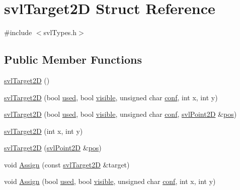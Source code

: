 \hypertarget{structsvl_target2_d}{\section{svl\-Target2\-D Struct Reference}
\label{structsvl_target2_d}
}


{\ttfamily \#include $<$svl\-Types.\-h$>$}

\subsection*{Public Member Functions}
\begin{DoxyCompactItemize}
\item 
\hyperlink{structsvl_target2_d_ae8f0d611fa66af1f6a157fec39503855}{svl\-Target2\-D} ()
\item 
\hyperlink{structsvl_target2_d_adcf9742ca9daddef7bb7ae43b7adf40c}{svl\-Target2\-D} (bool \hyperlink{structsvl_target2_d_a74896ef54f0cdc80faaee2a7321635bc}{used}, bool \hyperlink{structsvl_target2_d_a90567161b27a6a1c1a8d1bd15c108d63}{visible}, unsigned char \hyperlink{structsvl_target2_d_adae08264a579759ab62b38ba347dc196}{conf}, int x, int y)
\item 
\hyperlink{structsvl_target2_d_adf1a83e89f06d212b325b47b219cae87}{svl\-Target2\-D} (bool \hyperlink{structsvl_target2_d_a74896ef54f0cdc80faaee2a7321635bc}{used}, bool \hyperlink{structsvl_target2_d_a90567161b27a6a1c1a8d1bd15c108d63}{visible}, unsigned char \hyperlink{structsvl_target2_d_adae08264a579759ab62b38ba347dc196}{conf}, \hyperlink{structsvl_point2_d}{svl\-Point2\-D} \&\hyperlink{structsvl_target2_d_ab68be6f073df6ae78c134a2515873b6c}{pos})
\item 
\hyperlink{structsvl_target2_d_acc5a85edb97b779d56f06a282234ccd5}{svl\-Target2\-D} (int x, int y)
\item 
\hyperlink{structsvl_target2_d_ada5bc2911f468ff8848ba42b2594c569}{svl\-Target2\-D} (\hyperlink{structsvl_point2_d}{svl\-Point2\-D} \&\hyperlink{structsvl_target2_d_ab68be6f073df6ae78c134a2515873b6c}{pos})
\item 
void \hyperlink{structsvl_target2_d_a126b7a71755b8cffddb24b7928c040f4}{Assign} (const \hyperlink{structsvl_target2_d}{svl\-Target2\-D} \&target)
\item 
void \hyperlink{structsvl_target2_d_a5eacbff88965651fe6770b0618370fcf}{Assign} (bool \hyperlink{structsvl_target2_d_a74896ef54f0cdc80faaee2a7321635bc}{used}, bool \hyperlink{structsvl_target2_d_a90567161b27a6a1c1a8d1bd15c108d63}{visible}, unsigned char \hyperlink{structsvl_target2_d_adae08264a579759ab62b38ba347dc196}{conf}, int x, int y)

\end{DoxyCompactItemize}
